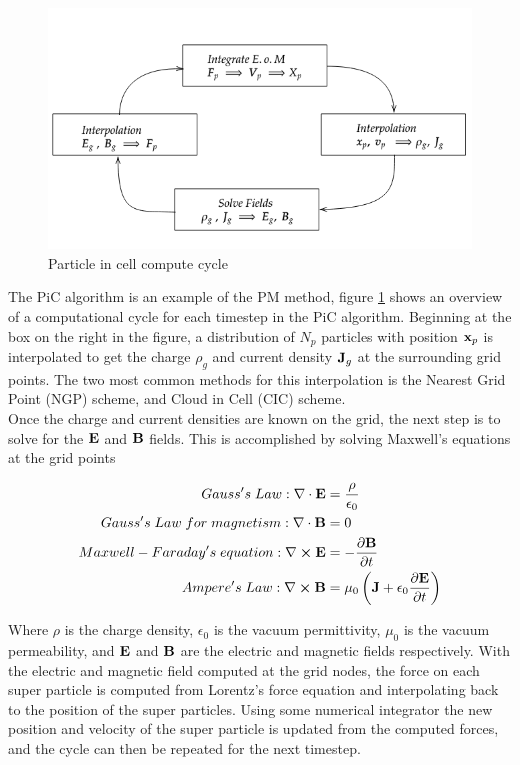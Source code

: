 \begin{figure}[h!]
    \centering
    \includegraphics[scale=0.6]{figures/PiC.png}
    \caption{Particle in cell compute cycle}
    \label{fig:pic}
\end{figure}

The PiC algorithm is an example of the PM method, figure \ref{fig:pic} shows an overview of a computational cycle for each timestep in the PiC algorithm. Beginning at the box on the right in the figure, a distribution of $N_p$ particles with position $\vb{x}_p$ is interpolated to get the charge $\rho_g$ and current density $\vb{J}_g$ at the surrounding grid points. The two most common methods for this interpolation is the Nearest Grid Point (NGP) scheme, and Cloud in Cell (CIC) scheme.\\
Once the charge and current densities are known on the grid, the next step is to solve for the $\vb{E}$ and $\vb{B}$ fields. This is accomplished by solving Maxwell's equations at the grid points

\begin{subequations}
    \begin{align}
        Gauss's\; Law: \nabla \cdot \vb{E} &= \frac{\rho}{\epsilon_0} \label{eq:gauss} \\
        Gauss's\; Law\; for\; magnetism: \nabla \cdot \vb{B} &= 0 \\
        Maxwell - Faraday's\; equation: \nabla \cross \vb{E} &= - \pdv{\vb{B}}{t}\\
        Ampere's\; Law: \nabla \cross \vb{B} &= \mu_0 \left(\vb{J} + \epsilon_0 \pdv{\vb{E}}{t} \right)
    \end{align}
\end{subequations}

Where $\rho$ is the charge density, $\epsilon_0$ is the vacuum permittivity, $\mu_0$ is the vacuum permeability, and $\vb{E}$ and $\vb{B}$ are the electric and magnetic fields respectively. With the electric and magnetic field computed at the grid nodes, the force on each super particle is computed from Lorentz's force equation and interpolating back to the position of the super particles. Using some numerical integrator the new position and velocity of the super particle is updated from the computed forces, and the cycle can then be repeated for the next timestep. 

